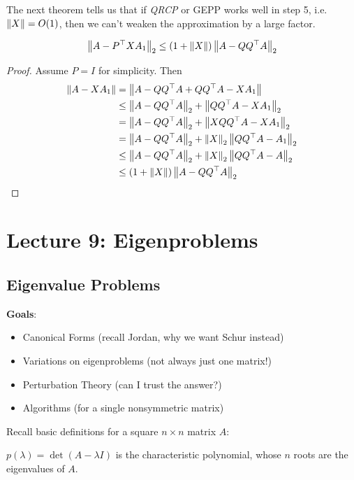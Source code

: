 \documentclass[11pt]{article}
\numberwithin{equation}{section}
\begin{document}
The next theorem tells us that if \textit{QRCP} or GEP\textit{}P works well in step 5, i.e. $\left\| X \right\| = O(1)$, 
then we can't weaken the approximation by a large factor.
\begin{theorem}
    \begin{align*}
        \left\| A-P^{\top} X A_1 \right\|_2 \leq (1 + \left\| X \right\|)\left\| A - Q Q^\top A \right\|_2
    \end{align*}
    \begin{proof}
        Assume $P = I$ for simplicity. Then
        \begin{align*}
            \left\| A - XA_1 \right\| &= \left\| A - Q Q^\top A + Q Q^\top A - XA_1 \right\| \\
            &\leq \left\| A - Q Q^\top A \right\|_2 + \left\| Q Q^\top A - XA_1 \right\|_2 \\
            &= \left\| A - Q Q^\top A \right\|_2 + \left\| XQ Q^\top A - XA_1 \right\|_2 \\
            &= \left\| A - Q Q^\top A \right\|_2 + \left\| X \right\|_2 \left\| Q Q^\top A - A_1 \right\|_2 \\
            &\leq \left\| A - Q Q^\top A \right\|_2 + \left\| X \right\|_2 \left\| Q Q^\top A - A \right\|_2 \\
            &\leq (1 + \left\| X \right\|)\left\| A - Q Q^\top A \right\|_2
        \end{align*}
    \end{proof}
\end{theorem}

\newpage
\section{Lecture 9: Eigenproblems}
\subsection{Eigenvalue Problems}
\textbf{Goals}:\begin{itemize}
    \item Canonical Forms (recall Jordan, why we want Schur instead)
    \item Variations on eigenproblems (not always just one matrix!)
    \item Perturbation Theory (can I trust the answer?)
    \item Algorithms (for a single nonsymmetric matrix)
\end{itemize}

Recall basic definitions for a square $n \times n$ matrix $A$:
\begin{definition}
    $p(\lambda) = \operatorname{det}(A - \lambda I)$ is the characteristic polynomial, whose $n$ roots are the eigenvalues of $A$.
\end{definition}
\end{document}
